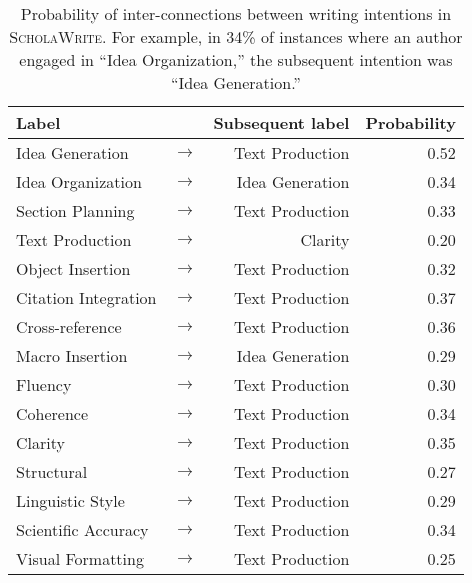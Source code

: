 \begin{table}[ht!]
\footnotesize
\centering
\begin{tabular}{@{}lp{1pt}rr@{}}
\toprule
Label & & Subsequent label & Probability  \\
\midrule
\colorbox{planningcolor}{Idea Generation} & $\rightarrow$ & \colorbox{implementationcolor}{Text Production} & 0.52 \\
\colorbox{planningcolor}{Idea Organization} & $\rightarrow$ & \colorbox{planningcolor}{Idea Generation} & 0.34  \\
\colorbox{planningcolor}{Section Planning} & $\rightarrow$ & \colorbox{implementationcolor}{Text Production} & 0.33  \\
\midrule
\colorbox{implementationcolor}{Text Production} & $\rightarrow$ & \colorbox{revisioncolor}{Clarity} & 0.20\\
\colorbox{implementationcolor}{Object Insertion} & $\rightarrow$ & \colorbox{implementationcolor}{Text Production} & 0.32 \\
\colorbox{implementationcolor}{Citation Integration} & $\rightarrow$ & \colorbox{implementationcolor}{Text Production} & 0.37 \\
\colorbox{implementationcolor}{Cross-reference} & $\rightarrow$ & \colorbox{implementationcolor}{Text Production} & 0.36  \\
\colorbox{implementationcolor}{Macro Insertion} & $\rightarrow$ & \colorbox{planningcolor}{Idea Generation} & 0.29 \\
\midrule
\colorbox{revisioncolor}{Fluency} & $\rightarrow$ & \colorbox{implementationcolor}{Text Production}  & 0.30 \\
\colorbox{revisioncolor}{Coherence} & $\rightarrow$ & \colorbox{implementationcolor}{Text Production}  & 0.34  \\
\colorbox{revisioncolor}{Clarity} & $\rightarrow$ & \colorbox{implementationcolor}{Text Production}  & 0.35  \\
\colorbox{revisioncolor}{Structural} & $\rightarrow$ & \colorbox{implementationcolor}{Text Production}  & 0.27  \\
\colorbox{revisioncolor}{Linguistic Style} & $\rightarrow$ & \colorbox{implementationcolor}{Text Production}  & 0.29 \\
\colorbox{revisioncolor}{Scientific Accuracy} & $\rightarrow$ & \colorbox{implementationcolor}{Text Production}  & 0.34 \\
\colorbox{revisioncolor}{Visual Formatting} & $\rightarrow$ & \colorbox{implementationcolor}{Text Production} & 0.25 \\
\bottomrule
\end{tabular}
\caption{Probability of inter-connections between writing intentions in \textsc{ScholaWrite}. For example, in 34\% of instances where an author engaged in ``Idea Organization,'' the subsequent intention was ``Idea Generation.'' }
\label{table:flow-intention-full}
\end{table}

